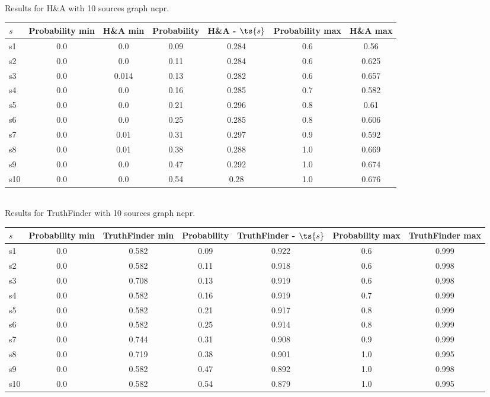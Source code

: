 \documentclass{article}
\begin{document}
\noindent Results for H\&A with 10 sources graph ncpr.

\noindent\begin{tabular}{|l|c|c|c|c|c|c|}
\hline
$s$& Probability min & H\&A min & Probability & H\&A - $\ts{s}$ & Probability max & H\&A max\\
\hline
s1 &0.0 & 0.0 & 0.09 & 0.284 & 0.6 & 0.56\\
\hline
s2 &0.0 & 0.0 & 0.11 & 0.284 & 0.6 & 0.625\\
\hline
s3 &0.0 & 0.014 & 0.13 & 0.282 & 0.6 & 0.657\\
\hline
s4 &0.0 & 0.0 & 0.16 & 0.285 & 0.7 & 0.582\\
\hline
s5 &0.0 & 0.0 & 0.21 & 0.296 & 0.8 & 0.61\\
\hline
s6 &0.0 & 0.0 & 0.25 & 0.285 & 0.8 & 0.606\\
\hline
s7 &0.0 & 0.01 & 0.31 & 0.297 & 0.9 & 0.592\\
\hline
s8 &0.0 & 0.01 & 0.38 & 0.288 & 1.0 & 0.669\\
\hline
s9 &0.0 & 0.0 & 0.47 & 0.292 & 1.0 & 0.674\\
\hline
s10 &0.0 & 0.0 & 0.54 & 0.28 & 1.0 & 0.676\\
\hline
\end{tabular}\\

\noindent Results for TruthFinder with 10 sources graph ncpr.

\noindent\begin{tabular}{|l|c|c|c|c|c|c|}
\hline
$s$& Probability min & TruthFinder min & Probability & TruthFinder - $\ts{s}$ & Probability max & TruthFinder max\\
\hline
s1 &0.0 & 0.582 & 0.09 & 0.922 & 0.6 & 0.999\\
\hline
s2 &0.0 & 0.582 & 0.11 & 0.918 & 0.6 & 0.998\\
\hline
s3 &0.0 & 0.708 & 0.13 & 0.919 & 0.6 & 0.998\\
\hline
s4 &0.0 & 0.582 & 0.16 & 0.919 & 0.7 & 0.999\\
\hline
s5 &0.0 & 0.582 & 0.21 & 0.917 & 0.8 & 0.999\\
\hline
s6 &0.0 & 0.582 & 0.25 & 0.914 & 0.8 & 0.999\\
\hline
s7 &0.0 & 0.744 & 0.31 & 0.908 & 0.9 & 0.999\\
\hline
s8 &0.0 & 0.719 & 0.38 & 0.901 & 1.0 & 0.995\\
\hline
s9 &0.0 & 0.582 & 0.47 & 0.892 & 1.0 & 0.998\\
\hline
s10 &0.0 & 0.582 & 0.54 & 0.879 & 1.0 & 0.995\\
\hline
\end{tabular}\\
\end{document}
